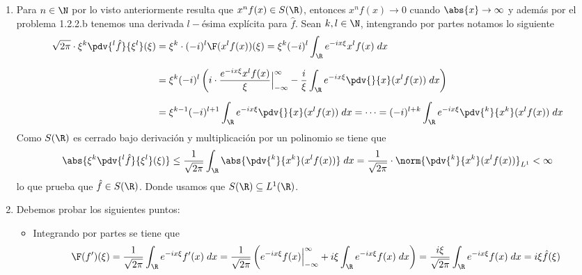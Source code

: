 \documentclass{article}
\begin{document}
\begin{enumerate}
    \item Para $n\in\N$ por lo visto anteriormente resulta que $x^{n}f(x)\in S(\R)$, entonces
    $x^{n}f(x)\to0$ cuando $\abs{x}\to\infty$ y además por el problema 1.2.2.b tenemos una 
    derivada $l-$ésima explícita para $\hat{f}$. Sean $k,l\in\N$, intengrando por partes notamos 
    lo siguiente
    \begin{align*}
        \sqrt{2\pi}\cdot\xi^{k}\pdv{^{l}\hat{f}}{\xi^{l}}(\xi)
        &= \xi^{k}\cdot(-i)^{l}\F(x^{l}f(x))(\xi)
        =\xi^{k}(-i)^{l}\int_{\R}e^{-ix\xi}x^{l}f(x)\hspace{1mm}dx \\[2mm]
        &= \xi^{k}(-i)^{l}\left(i\cdot\frac{e^{-ix\xi}x^{l}f(x)}{\xi}\Big|_{-\infty}^{\infty}
        -\frac{i}{\xi}\int_{\R}e^{-ix\xi}\pdv{}{x}(x^{l}f(x))\hspace{1mm}dx\right) \\[2mm]
        &= \xi^{k-1}(-i)^{l+1}\int_{\R}e^{-ix\xi}\pdv{}{x}(x^{l}f(x))\hspace{1mm}dx=\cdots
        =(-i)^{l+k}\int_{\R}e^{-ix\xi}\pdv{^{k}}{x^{k}}(x^{l}f(x))\hspace{1mm}dx
    \end{align*}
    Como $S(\R)$ es cerrado bajo derivación y multiplicación por un polinomio se tiene que
    \begin{equation*}
        \abs{\xi^{k}\pdv{^{l}\hat{f}}{\xi^{l}}(\xi)}
        \leq\frac{1}{\sqrt{2\pi}}\int_{\R}\abs{\pdv{^{k}}{x^{k}}(x^{l}f(x))}\hspace{1mm}dx
        =\frac{1}{\sqrt{2\pi}}\cdot\norm{\pdv{^{k}}{x^{k}}(x^{l}f(x))}_{L^{1}}<\infty
    \end{equation*}
    lo que prueba que $\hat{f}\in S(\R)$. Donde usamos que $S(\R)\subseteq L^{1}(\R)$.

    \item Debemos probar los siguientes puntos:
    \begin{itemize}
        \item Integrando por partes se tiene que
        \begin{equation*}
            \F(f')(\xi)=\frac{1}{\sqrt{2\pi}}\int_{\R}e^{-ix\xi}f'(x)\hspace{1mm}dx
            =\frac{1}{\sqrt{2\pi}}\left(e^{-ix\xi}f(x)\Big|_{-\infty}^{\infty}
            +i\xi\int_{\R}e^{-ix\xi}f(x)\hspace{1mm}dx\right)
            =\frac{i\xi}{\sqrt{2\pi}}\int_{\R}e^{-ix\xi}f(x)\hspace{1mm}dx=i\xi\hat{f}(\xi)
        \end{equation*}


\end{itemize}
\end{enumerate}
\end{document}
